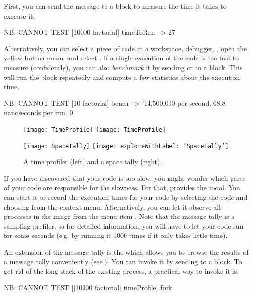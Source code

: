 \documentclass[a4paper,10pt,twoside]{book}
\begin{document}
First, you can send the message  to a block to measure the time it takes to execute it:
\begin{code}{NB: CANNOT TEST}
[10000 factorial] timeToRun --> 27
\end{code}
\noindent
Alternatively, you can select a piece of code in a workspace, debugger, \autc, open the yellow button menu, and select .
If a single execution of the code is too fast to measure (confidently), you can also \emph{benchmark} it by sending  or  to a block.
This will run the block repeatedly and compute a few statistics about the execution time.
\begin{code}{NB: CANNOT TEST}
[10 factorial] bench --> '14,500,000 per second. 68.8 nanoseconds per run. 0 %
\end{code}

\begin{figure}[btp]
	\begin{minipage}[t]{0.48\textwidth}
		\ifluluelse
			{\texttt{[image: TimeProfile]}}
			{\texttt{[image: TimeProfile]}}
		\label{fig:TimeProfile}
	\end{minipage}
	\hfill
	\begin{minipage}[t]{0.48\textwidth}
		\ifluluelse
			{\texttt{[image: SpaceTally]}}
			{\texttt{[image: exploreWithLabel: 'SpaceTally']}}
		\label{fig:SpaceTally}
	\end{minipage}
	\caption{A time profiler (left) and a space tally (right).}
\end{figure}

If you have discovered that your code is too slow, you might wonder which parts of your code are responsible for the slowness.
For that, \sq provides the  toool.
You can start it to record the execution times for your code by selecting the code and choosing  from the context menu.
Alternatively, you can let it observe all processes in the image from the menu item .
Note that the message tally is a sampling profiler, so for detailed information, you will have to let your code run for some seconds (e.g. by running it 1000 times if it only takes little time).

An extension of the message tally is the  which allows you to browse the results of a message tally conveniently (see ).
You can invoke it by sending  to a block.
To get rid of the long stack of the existing process, a practical way to invoke it is:
\begin{code}{NB: CANNOT TEST}
[[10000 factorial] timeProfile] fork
\end{code}
\end{document}
